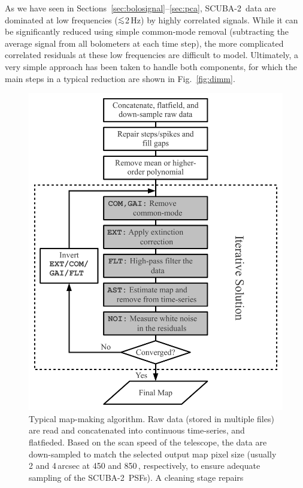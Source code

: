 \documentclass[useAMS,usenatbib,nofootinbib]{mn2e}
\newcommand{\scuba}{SCUBA-2}
\def\lsim{\mathrel{\lower2.5pt\vbox{\lineskip=0pt\baselineskip=0pt
          \hbox{$<$}\hbox{$\sim$}}}}
\begin{document}
As we have seen in Sections~\ref{sec:bolosignal}--\ref{sec:pca},
\scuba\ data are dominated at low frequencies ($\lsim$2\,Hz) by highly
correlated signals. While it can be significantly reduced using simple
common-mode removal (subtracting the average signal from all
bolometers at each time step), the more complicated correlated
residuals at these low frequencies are difficult to model. Ultimately,
a very simple approach has been taken to handle both components, for
which the main steps in a typical reduction are shown in
Fig.~\ref{fig:dimm}.

\begin{figure}
\centering
\includegraphics[width=\linewidth]{dimm}
\caption{Typical map-making algorithm. Raw data (stored in multiple
  files) are read and concatenated into continuous time-series, and
  flatfieded. Based on the scan speed of the telescope, the data are
  down-sampled to match the selected output map pixel size (usually 2
  and 4\,arcsec at 450 and 850\,\micron, respectively, to ensure
  adequate sampling of the \scuba\ PSFs). A cleaning stage repairs
}
\end{figure}
\end{document}
